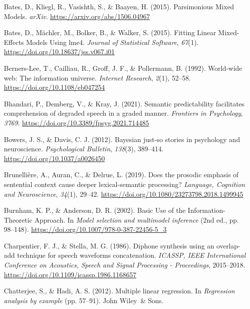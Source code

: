 \documentclass[a4paper, nobind]{templates/ociamthesis}
\newlength{\cslhangindent}
\newenvironment{CSLReferences}[2] %
 {%
  \setlength{\parindent}{0pt}
  \ifodd #1
  \let\oldpar\par
  \def\par{\hangindent=\cslhangindent\oldpar}
  \fi
  \setlength{\parskip}{1mm}
  \setlength{\baselineskip}{6mm}
 }%
 {}
\begin{document}
\begin{CSLReferences}{1}{0}
\leavevmode{}%
Bates, D., Kliegl, R., Vasishth, S., \& Baayen, H. (2015). {Parsimonious Mixed Models}. \emph{arXiv}. \url{https://arxiv.org/abs/1506.04967}

\leavevmode{}%
Bates, D., Mächler, M., Bolker, B., \& Walker, S. (2015). Fitting Linear Mixed-Effects Models Using lme4. \emph{Journal of Statistical Software}, \emph{67}(1). \url{https://doi.org/10.18637/jss.v067.i01}

\leavevmode{}%
Berners-Lee, T., Cailliau, R., Groff, J. F., \& Pollermann, B. (1992). {World-wide web: The information universe}. \emph{Internet Research}, \emph{2}(1), 52--58. \url{https://doi.org/10.1108/eb047254}

\leavevmode{}%
Bhandari, P., Demberg, V., \& Kray, J. (2021). {Semantic predictability facilitates comprehension of degraded speech in a graded manner}. \emph{Frontiers in Psychology}, \emph{3769}. \url{https://doi.org/10.3389/fpsyg.2021.714485}

\leavevmode{}%
Bowers, J. S., \& Davis, C. J. (2012). {Bayesian just-so stories in psychology and neuroscience}. \emph{Psychological Bulletin}, \emph{138}(3), 389--414. \url{https://doi.org/10.1037/a0026450}

\leavevmode{}%
Brunellière, A., Auran, C., \& Delrue, L. (2019). {Does the prosodic emphasis of sentential context cause deeper lexical-semantic processing?} \emph{Language, Cognition and Neuroscience}, \emph{34}(1), 29--42. \url{https://doi.org/10.1080/23273798.2018.1499945}

\leavevmode{}%
Burnham, K. P., \& Anderson, D. R. (2002). {Basic Use of the Information-Theoretic Approach}. In \emph{Model selection and multimodel inference} (2nd ed., pp. 98--148). \url{https://doi.org/10.1007/978-0-387-22456-5_3}

\leavevmode{}%
Charpentier, F. J., \& Stella, M. G. (1986). {Diphone synthesis using an overlap-add technique for speech waveforms concatenation.} \emph{ICASSP, IEEE International Conference on Acoustics, Speech and Signal Processing - Proceedings}, 2015--2018. \url{https://doi.org/10.1109/icassp.1986.1168657}

\leavevmode{}%
Chatterjee, S., \& Hadi, A. S. (2012). Multiple linear regression. In \emph{Regression analysis by example} (pp. 57--91). John Wiley~\& Sons.


\end{CSLReferences}
\end{document}

